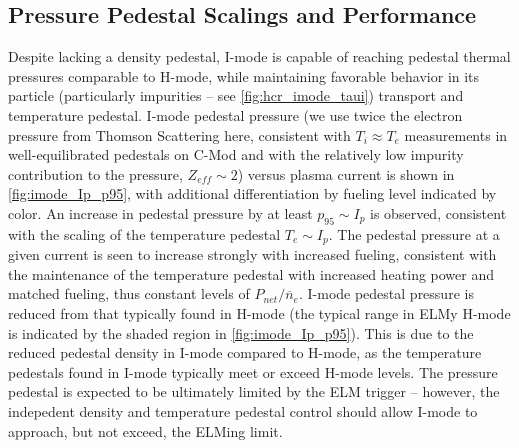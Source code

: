 \subsection{Pressure Pedestal Scalings and Performance}\label{subsec:imode_pres}

Despite lacking a density pedestal, I-mode is capable of reaching pedestal thermal pressures comparable to H-mode, while maintaining favorable behavior  in its particle (particularly impurities -- see \cref{fig:hcr_imode_taui}) transport and temperature pedestal.  I-mode pedestal pressure (we use twice the electron pressure from Thomson Scattering here, consistent with $T_i \approx T_e$ measurements in well-equilibrated pedestals on C-Mod \cite{Hubbard2011} and with the relatively low impurity contribution to the pressure, $Z_{eff} \sim 2$) versus plasma current is shown in \cref{fig:imode_Ip_p95}, with additional differentiation by fueling level indicated by color.  An increase in pedestal pressure by at least $p_{95} \sim I_p$ is observed, consistent with the scaling of the temperature pedestal $T_e \sim I_p$.  The pedestal pressure at a given current is seen to increase strongly with increased fueling, consistent with the maintenance of the temperature pedestal with increased heating power and matched fueling, thus constant levels of $P_{net}/\overline{n}_e$.  I-mode pedestal pressure is reduced from that typically found in H-mode (the typical range in ELMy H-mode is indicated by the shaded region in \cref{fig:imode_Ip_p95}).  This is due to the reduced pedestal density in I-mode compared to H-mode, as the temperature pedestals found in I-mode typically meet or exceed H-mode levels.  The pressure pedestal is expected to be ultimately limited by the ELM trigger -- however, the indepedent density and temperature pedestal control should allow I-mode to approach, but not exceed, the ELMing limit.

\begin{figure}[t]
 \pushtooutside
\end{figure}


